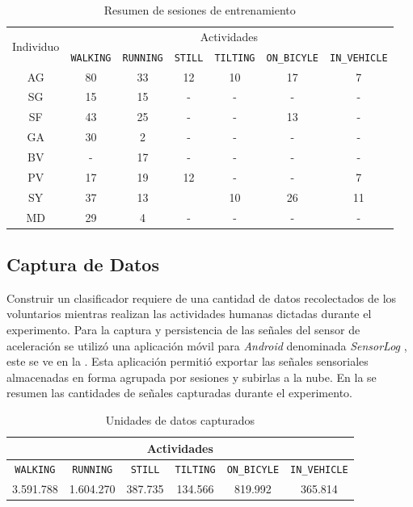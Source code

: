 \begin{table}[h]
\begin{centering}
\begin{tabular}{|c|c|c|c|c|c|c|}
\hline 
\multirow{2}{*}{Individuo} & \multicolumn{6}{c|}{Actividades}\tabularnewline
\cline{2-7} 
 & \texttt{\footnotesize{}WALKING} & \texttt{\footnotesize{}RUNNING} & \texttt{\footnotesize{}STILL} & \texttt{\footnotesize{}TILTING} & \texttt{\footnotesize{}ON\_BICYLE} & \texttt{\footnotesize{}IN\_VEHICLE}\tabularnewline
\hline 
\hline 
AG & 80 & 33 & 12 & 10 & 17 & 7\tabularnewline
\hline 
SG & 15 & 15 & - & - & - & -\tabularnewline
\hline 
SF & 43 & 25 & - & - & 13 & -\tabularnewline
\hline 
GA & 30 & 2 & - & - & - & -\tabularnewline
\hline 
BV & - & 17 & - & - & - & -\tabularnewline
\hline 
PV & 17 & 19 & 12 & - & - & 7\tabularnewline
\hline 
SY & 37 & 13 &  & 10 & 26 & 11\tabularnewline
\hline 
MD & 29 & 4 & - & - & - & -\tabularnewline
\hline 
\end{tabular}
\par\end{centering}
\caption{\label{tab6:sesiones}Resumen de sesiones de entrenamiento}
\end{table}


\subsection{Captura de Datos}

\label{ssec6:recolecci=0000F3n}Construir un clasificador requiere
de una cantidad de datos recolectados de los voluntarios mientras
realizan las actividades humanas dictadas durante el experimento.
Para la captura y persistencia de las señales del sensor de aceleración
se utilizó una aplicación móvil para \emph{Android }denominada \emph{SensorLog}
\cite{Alan2014s}, este se ve en la . Esta
aplicación permitió exportar las señales sensoriales almacenadas en
forma agrupada por sesiones y subirlas a la nube. En la 
se resumen las cantidades de señales capturadas durante el experimento.

\begin{table}[h]
\begin{centering}
\begin{tabular}{|c|c|c|c|c|c|}
\hline 
\multicolumn{6}{|c|}{Actividades}\tabularnewline
\hline 
\texttt{\footnotesize{}WALKING} & \texttt{\footnotesize{}RUNNING} & \texttt{\footnotesize{}STILL} & \texttt{\footnotesize{}TILTING} & \texttt{\footnotesize{}ON\_BICYLE} & \texttt{\footnotesize{}IN\_VEHICLE}\tabularnewline
\hline 
\hline 
3.591.788 & 1.604.270 & 387.735 & 134.566 & 819.992 & 365.814\tabularnewline
\hline 
\end{tabular}
\par\end{centering}
\caption{\label{tab6:captura}Unidades de datos capturados}
\end{table}


